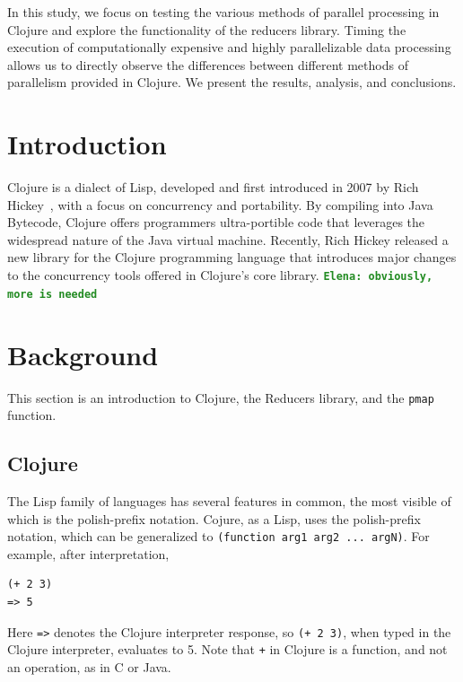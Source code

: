 \documentclass[12pt]{article}
\newcommand{\comment}[1]{{\bf \tt  {#1}}}
\newcommand{\emcomment}[1]{\textcolor{ForestGreen}{\comment{Elena: {#1}}}}
\newcommand{\clocode}[1]{{\texttt {#1}}}
\begin{document}
In this study, we focus on testing the various methods of parallel processing in Clojure and explore the functionality of the reducers library. Timing the execution of computationally expensive and highly parallelizable data processing allows us to directly observe the differences between different methods of parallelism provided in Clojure. We present the results, analysis, and conclusions.


 \newpage

\setcounter{page}{1}


\section{Introduction}\label{sec:intro}

	 Clojure is a dialect of Lisp, developed and first introduced in 2007 by Rich Hickey~\cite{Hickey:2008}, with a focus on concurrency and portability. By compiling into Java Bytecode, Clojure offers programmers ultra-portible code that leverages the widespread nature of the Java virtual machine. 
Recently, Rich Hickey released a new library for the Clojure programming language that introduces major changes to the concurrency tools offered in Clojure's core library.
\emcomment{obviously, more is needed}

\section{Background}\label{sec:background}
This section is an introduction to Clojure, the Reducers library, and the \clocode{pmap} function. 

\subsection{Clojure}\label{sec:clojure}
The Lisp family of languages has several features in common, the most visible of which is the polish-prefix notation. Cojure, as a Lisp, uses the polish-prefix notation, which can be generalized to \clocode{(function arg1 arg2 ... argN)}. For example, after interpretation, 
\begin{verbatim}
(+ 2 3)
=> 5
\end{verbatim}
Here \clocode{=>} denotes the Clojure interpreter response, so \clocode{(+ 2 3)}, when typed in the Clojure interpreter, evaluates to 5. 
Note that \clocode{+} in Clojure is a function, and not an operation, as in C or Java. 
\end{document}
